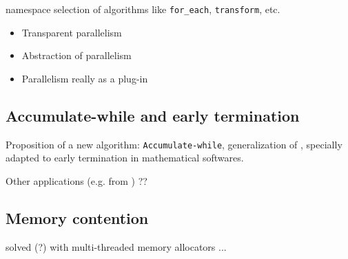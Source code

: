 \documentclass[runningheads,a4paper]{llncs}
\begin{document}
namespace selection of algorithms like \verb!for_each!,
\verb!transform!, etc. 

\begin{itemize}
\item Transparent parallelism
\item Abstraction of parallelism
\item Parallelism really as a plug-in
\end{itemize}

\subsection{Accumulate-while and early termination}
Proposition of a new algorithm:
\verb!Accumulate-while!, generalization of \cite{jgd:2010:crt},
specially adapted to early termination in mathematical softwares.

Other applications (e.g. from \cite{Beaumont:2004:PMAA}) ??


\subsection{Memory contention}
solved (?) with multi-threaded memory allocators ...
\end{document}
